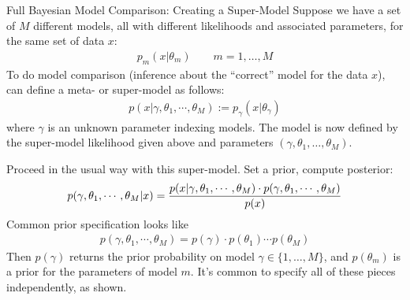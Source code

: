 \documentclass[aspectratio=169, handout]{beamer}
\begin{document}
{\scriptsize
\begin{frame}{Full Bayesian Model Comparison: Creating a Super-Model}
Suppose we have a set of $M$ different models, all with different
likelihoods and associated parameters, for the same set of data $x$:
\begin{align*}
  p_m(x|\theta_m)
  \qquad
  m=1,\ldots,M
\end{align*}
To do \alert{model comparison} (inference about the ``correct'' model
for the data $x$), can define a \alert{meta-} or \alert{super-model} as
follows:
\begin{align*}
  p(x|\gamma,\theta_1,\cdots,\theta_M)
  :=
  p_\gamma(x|\theta_\gamma)
\end{align*}
where $\gamma$ is an unknown \alert{parameter} indexing models.
The model is now defined by the super-model likelihood given above
and parameters $(\gamma,\theta_1,\ldots,\theta_M)$.

Proceed in the usual way with this super-model.
Set a prior, compute posterior:
\begin{align*}
  p(\gamma,\theta_1,\cdots,\theta_M|x)
  =
  \frac{%
    p(x|\gamma,\theta_1,\cdots,\theta_M)
    \cdot
    p(\gamma,\theta_1,\cdots,\theta_M)
  }{%
    p(x)
  }
\end{align*}
Common prior specification looks like
\begin{align*}
  p(\gamma,\theta_1,\cdots,\theta_M)
  =
  p(\gamma)
  \cdot
  p(\theta_1)
  \cdots
  p(\theta_M)
\end{align*}
Then $p(\gamma)$ returns the prior probability on model
$\gamma\in\{1,\ldots,M\}$, and $p(\theta_m)$ is a prior for the
parameters of model $m$.
It's common to specify all of these pieces independently, as shown.
\end{frame}
}
\end{document}
